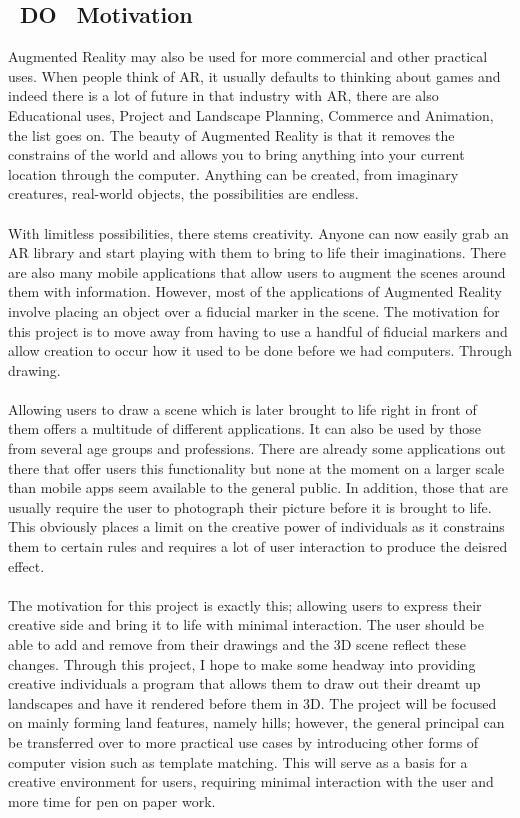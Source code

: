 \documentclass[11pt]{article}
\begin{document}
\subsection{~DO~ Motivation}
Augmented Reality may also be used for more commercial and other practical uses. 
When people think of AR, it usually defaults to thinking about games and 
indeed there is a lot of future in that industry with AR, there are also
Educational uses, Project and Landscape Planning, Commerce and Animation, 
the list goes on. The beauty of Augmented Reality is that it removes
the constrains of the world and allows you to bring anything into your
current location through the computer. Anything can be created, from 
imaginary creatures, real-world objects, the possibilities are endless.\\ 
\\
With limitless possibilities, there stems creativity. Anyone can now
easily grab an AR library and start playing with them to bring to life
their imaginations. There are also many mobile applications that allow
users to augment the scenes around them with information. However, most
of the applications of Augmented Reality involve placing an object over
a fiducial marker in the scene. The motivation for this project is to 
move away from having to use a handful of fiducial markers and allow
creation to occur how it used to be done before we had computers. 
Through drawing.\\
\\
Allowing users to draw a scene which is later brought to life right 
in front of them offers a multitude of different applications. It can
also be used by those from several age groups and professions. There
are already some applications out there that offer users this 
functionality but none at the moment on a larger scale than mobile apps
seem available to the general public. In addition, those that are usually
require the user to photograph their picture before it is brought to life.
This obviously places a limit on the creative power of individuals as
it constrains them to certain rules and requires a lot of user interaction
to produce the deisred effect. \\
\\
The motivation for this project is exactly this; allowing users to 
express their creative side and bring it to life with minimal interaction.
The user should be able to add and remove from their drawings and the
3D scene reflect these changes.
Through this project, I hope to make some headway into providing creative
individuals a program that allows them to draw out their dreamt up
landscapes and have it rendered before them in 3D. The project will be focused
on mainly forming land features, namely hills; however, the general principal can be 
transferred over to more practical use cases by introducing other forms of
computer vision such as template matching. This will serve as a basis for a 
creative environment for users, requiring minimal interaction with the user and
more time for pen on paper work.
\end{document}
